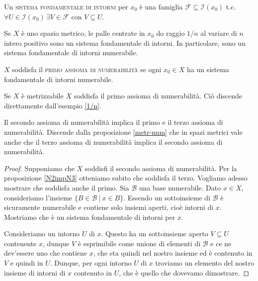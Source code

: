 \begin{defn}
	Un \textsc{sistema fondamentale di intorni} per $x_0$ è una famiglia
	$\mathcal{F} \subseteq \mathcal{I}(x_0)$ t.c. $\forall U \in
	\mathcal{I}(x_0) \, \exists V \in \mathcal{F}$ con $V \subseteq U$.
\end{defn}

\begin{ex} \label{1/n}
	Se $X$ è uno spazio metrico, le palle centrate in $x_0$ do raggio $1/n$ al
	variare di $n$ intero positivo sono un sistema fondamentale di intorni. In
	particolare, sono un sistema fondamentale di intorni numerabile.
\end{ex}

\begin{defn} \label{N1}
	$X$ soddisfa il \textsc{primo assioma di numerabilità} se ogni $x_0 \in X$
	ha un sistema fondamentale di intorni numerabile.
\end{defn}

\begin{ftt}
	Se $X$ è metrizzabile $X$ soddisfa il primo assioma di numerabilità. Ciò
	discende direttamente dall'esempio \ref{1/n}.
\end{ftt}

\begin{prop} \label{N2power}
	Il secondo assioma di numerabilità implica il primo e il terzo assioma di
	numerabilità. Discende dalla proposizione \ref{metr-num} che in spazi
	metrici vale anche che il terzo assioma di numerabilità implica il secondo
	assioma di numerabilità.
\end{prop}

\begin{proof}
	Supponiamo che $X$ soddisfi il secondo assioma di numerabilità. Per la
	proposizione \ref{N2impN3} otteniamo subito che soddisfa il terzo. Vogliamo
	adesso mostrare che soddisfa anche il primo. Sia $\mathcal{B}$ una base
	numerabile. Dato $x \in X$, consideriamo l'insieme ${\{ B \in \mathcal{B}\
	|\ x \in B \}}$. Essendo un sottoinsieme di $\mathcal{B}$ è sicuramente
	numerabile e contiene solo insiemi aperti, cioè intorni di $x$. Mostriamo
	che è un sistema fondamentale di intorni per $x$.

	Consideriamo un intorno $U$ di $x$. Questo ha un sottoinsieme aperto $V
	\subseteq U$ contenente $x$, dunque $V$ è esprimibile come unione di
	elementi di $\mathcal{B}$ e ce ne dev'essere uno che contiene $x$, che sta
	quindi nel nostro insieme ed è contenuto in $V$ e quindi in $U$. Dunque, per
	ogni intorno $U$ di $x$ troviamo un elemento del nostro insieme di intorni
	di $x$ contenuto in $U$, che è quello che dovevamo dimostrare.
\end{proof}

